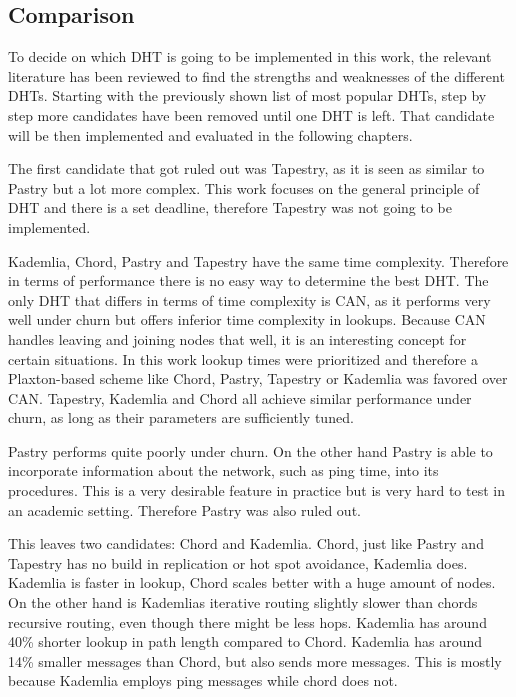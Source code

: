 \documentclass[a4paper, 12pt]{article} %
\begin{document}
\subsection{Comparison}

To decide on which DHT is going to be implemented in this work, the relevant literature has been reviewed to find the strengths and weaknesses of the different DHTs. Starting with the previously shown list of most popular DHTs, step by step more candidates have been removed until one DHT is left. That candidate will be then implemented and evaluated in the following chapters.

The first candidate that got ruled out was Tapestry, as it is seen as similar to Pastry but a lot more complex\cite{Rowstron2001}. This work focuses on the general principle of DHT and there is a set deadline, therefore Tapestry was not going to be implemented.

Kademlia, Chord, Pastry and Tapestry have the same time complexity\cite{Tiendrebeogo2012}. Therefore in terms of performance there is no easy way to determine the best DHT. The only DHT that differs in terms of time complexity is CAN, as it performs very well under churn but offers inferior time complexity in lookups\cite{Lua05asurvey}. Because CAN handles leaving and joining nodes that well, it is an interesting concept for certain situations. In this work lookup times were prioritized and therefore a Plaxton-based scheme like Chord, Pastry, Tapestry or Kademlia was favored over CAN. Tapestry, Kademlia and Chord all achieve similar performance under churn, as long as their parameters are sufficiently tuned\cite{Li04comparingthe}.

Pastry performs quite poorly under churn\cite{Lua05asurvey}. On the other hand Pastry is able to incorporate information about the network, such as ping time, into its procedures\cite{naqvi_2017}. This is a very desirable feature in practice but is very hard to test in an academic setting. Therefore Pastry was also ruled out.

This leaves two candidates: Chord and Kademlia. Chord, just like Pastry and Tapestry has no build in replication or hot spot avoidance\cite{Lua05asurvey}, Kademlia does. Kademlia is faster in lookup, Chord scales better with a huge amount of nodes\cite{Harjula2011}. On the other hand is Kademlias iterative routing slightly slower than chords recursive routing, even though there might be less hops\cite{Li04comparingthe}. Kademlia has around 40\% shorter lookup in path length compared to Chord\cite{Harjula2011}. Kademlia has around 14\% smaller messages than Chord, but also sends more messages\cite{Harjula2011}. This is mostly because Kademlia employs ping messages while chord does not.
\end{document}
